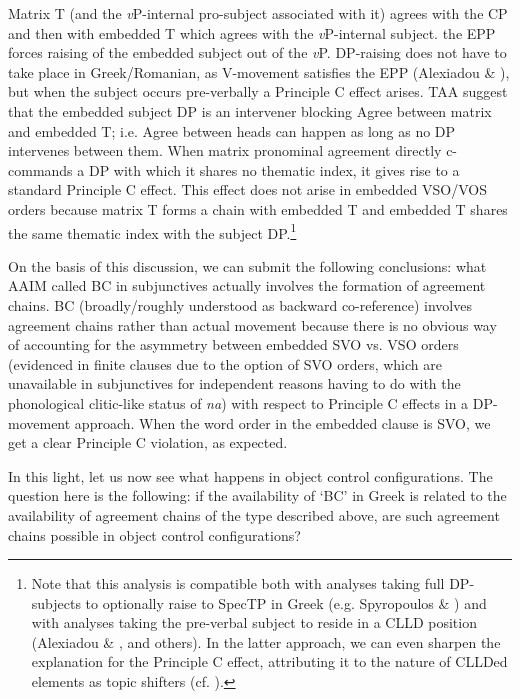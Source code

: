 \documentclass[output=paper]{langsci/langscibook}
\begin{document}
Matrix T (and the \textit{v}P-internal pro-subject associated with it) agrees with the CP and then with embedded T which agrees with the \textit{v}P-internal subject.   the EPP forces raising of the embedded subject out of the \textit{v}P. DP-raising does not have to take place in Greek/Romanian, as V-movement satisfies the EPP (Alexiadou \& \citealt{Anagnostopoulou1998}), but when the subject occurs pre-verbally a Principle C effect arises. TAA suggest that the embedded subject DP is an intervener blocking Agree between matrix and embedded T; i.e. Agree between heads can happen as long as no DP intervenes between them. When matrix pronominal agreement directly c-commands a DP with which it shares no thematic index, it gives rise to a standard Principle C effect. This effect does not arise in embedded VSO/VOS orders because matrix T forms a chain with embedded T and embedded T shares the same thematic index with the subject DP.\footnote{Note that this analysis is compatible both with analyses taking full DP-subjects to optionally raise to SpecTP in Greek (e.g. Spyropoulos \& \citealt{Revithiadou2009}) and with analyses taking the pre-verbal subject to reside in a CLLD position (Alexiadou \& \citealt{Anagnostopoulou1998}, \citealt{Barbosa2009} and others). In the latter approach, we can even sharpen the explanation for the Principle C effect, attributing it to the nature of CLLDed elements as topic shifters (cf. \citealt{Frascarelli2007}).}   

\begin{styleNormalWeb}
On the basis of this discussion, we can submit the following conclusions: what AAIM called BC in subjunctives actually involves the formation of agreement chains. BC (broadly/roughly understood as backward co-reference) involves agreement chains rather than actual movement because there is no obvious way of accounting for the asymmetry between embedded SVO vs. VSO orders (evidenced in finite clauses due to the option of SVO orders, which are unavailable in subjunctives for independent reasons having to do with the phonological clitic-like status of \textit{na}) with respect to Principle C effects in a DP-movement approach. When the word order in the embedded clause is SVO, we get a clear Principle C violation, as expected.
\end{styleNormalWeb}

\begin{styleNurTexti}
In this light, let us now see what happens in object control configurations. The question here is the following: if the availability of ‘BC’ in Greek is related to the availability of agreement chains of the type described above, are such agreement chains possible in object control configurations?
\end{styleNurTexti}
\end{document}
